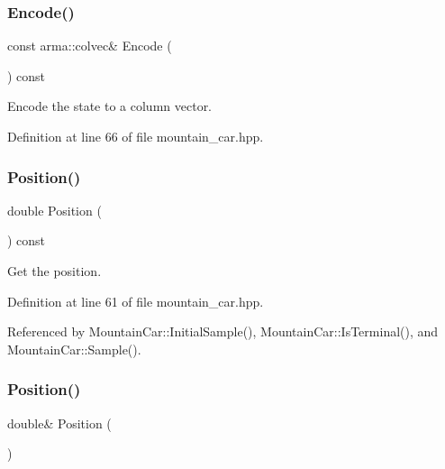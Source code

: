 \subsubsection{Encode()}
{\footnotesize\ttfamily const arma\+::colvec\& Encode (\begin{DoxyParamCaption}{ }\end{DoxyParamCaption}) const\hspace{0.3cm}{\ttfamily [inline]}}



Encode the state to a column vector. 



Definition at line 66 of file mountain\+\_\+car.\+hpp.

\mbox{\label{classmlpack_1_1rl_1_1MountainCar_1_1State_adc41cb3d3f5bdd1bd67dc963ce78c20c}} 
\subsubsection{Position()\hspace{0.1cm}{\footnotesize\ttfamily [1/2]}}
{\footnotesize\ttfamily double Position (\begin{DoxyParamCaption}{ }\end{DoxyParamCaption}) const\hspace{0.3cm}{\ttfamily [inline]}}



Get the position. 



Definition at line 61 of file mountain\+\_\+car.\+hpp.



Referenced by Mountain\+Car\+::\+Initial\+Sample(), Mountain\+Car\+::\+Is\+Terminal(), and Mountain\+Car\+::\+Sample().

\mbox{\label{classmlpack_1_1rl_1_1MountainCar_1_1State_a005c39713bc5c65715a94572bfb5fc29}} 
\subsubsection{Position()\hspace{0.1cm}{\footnotesize\ttfamily [2/2]}}
{\footnotesize\ttfamily double\& Position (\begin{DoxyParamCaption}{ }\end{DoxyParamCaption})\hspace{0.3cm}{\ttfamily [inline]}}



